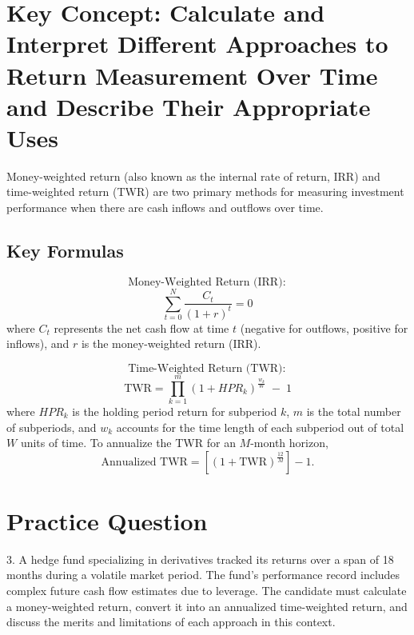 \section*{Key Concept: Calculate and Interpret Different Approaches to Return Measurement Over Time and Describe Their Appropriate Uses}

Money-weighted return (also known as the internal rate of return, IRR) and time-weighted return (TWR) are two primary methods for measuring investment performance when there are cash inflows and outflows over time.

\subsection*{Key Formulas}
\[
\text{Money-Weighted Return (IRR)}:
\]
\[
\sum_{t=0}^{N} \frac{C_t}{(1 + r)^{t}} = 0
\]
where \(C_t\) represents the net cash flow at time \(t\) (negative for outflows, positive for inflows), and \(r\) is the money-weighted return (IRR).

\[
\text{Time-Weighted Return (TWR)}:
\]
\[
\text{TWR} = \prod_{k=1}^{m} (1 + HPR_k)^{\frac{w_k}{W}} \; - \; 1
\]
where \(HPR_k\) is the holding period return for subperiod \(k\), \(m\) is the total number of subperiods, and \(w_k\) accounts for the time length of each subperiod out of total \(W\) units of time. To annualize the TWR for an \(M\)-month horizon,
\[
\text{Annualized TWR} = \left[(1 + \text{TWR})^{\frac{12}{M}}\right] - 1.
\]

\section*{Practice Question}
3. A hedge fund specializing in derivatives tracked its returns over a span of 18 months during a volatile market period. The fund's performance record includes complex future cash flow estimates due to leverage. The candidate must calculate a money-weighted return, convert it into an annualized time-weighted return, and discuss the merits and limitations of each approach in this context.

